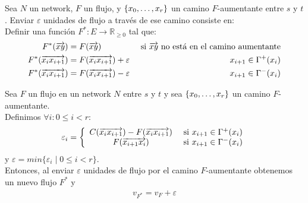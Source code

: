 \begin{definition}
Sea $N$ un network, $F$ un flujo, y $\{x_0,\mathellipsis,x_r\}$ un camino $F$-aumentante entre $s$ y $t$. Enviar $\varepsilon$ unidades de flujo a través de ese camino consiste en:\\
Definir una función $F^* \colon E \to \mathbb{R}_{\ge 0}$ tal que:
\begin{align}
    F^*(\overrightarrow{xy}) &= F(\overrightarrow{xy}) &\text{ si $\overrightarrow{xy}$ no está en el camino aumentante} \\
    F^*(\overrightarrow{x_i x_{i+1}}) &= F(\overrightarrow{x_i x_{i+1}}) + \varepsilon & x_{i+1} \in \Gamma^{+}(x_i) \\
    F^*(\overrightarrow{x_i x_{i+1}}) &= F(\overrightarrow{x_i x_{i+1}}) - \varepsilon & x_{i+1} \in \Gamma^{-}(x_i)
\end{align}
\end{definition}

\begin{lemma}\label{flujo_camino_aumentante}
Sea $F$ un flujo en un network $N$ entre $s$ y $t$ y sea $\{x_0,\mathellipsis,x_r\}$ un camino $F$-aumentante.\\
Definimos $\forall i: 0\le i < r:$  \begin{align}
    \varepsilon_i = \left\{
    \begin{array}{cc}
         C(\overrightarrow{x_i x_{i+1}}) - F(\overrightarrow{x_i x_{i+1}}) &\text{ si } x_{i+1} \in \Gamma^{+}(x_i)\\
         F(\overrightarrow{x_{i+1} x_i}) &\text{ si } x_{i+1} \in \Gamma^{-} (x_i)
    \end{array}
    \right.
\end{align}
y $\varepsilon = min\{\varepsilon_i\mid 0\le i < r \}$.\\

Entonces, al enviar $\varepsilon$ unidades de flujo por el camino $F$-aumentante obtenemos un nuevo flujo $F^{*}$ y \begin{align}
    v_{F^{*}} = v_F + \varepsilon
\end{align}
\end{lemma}

